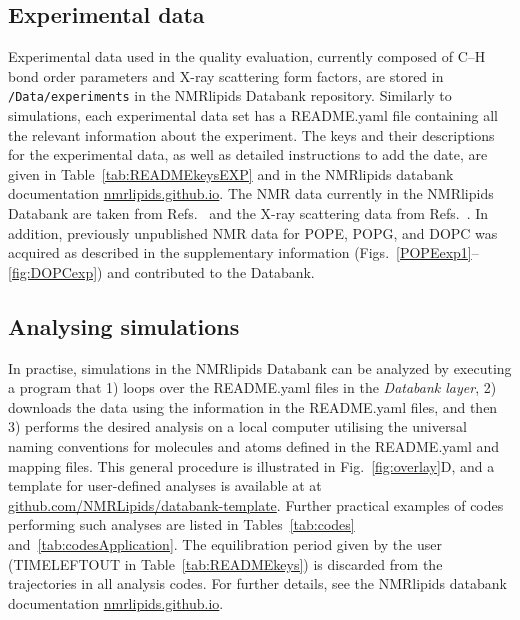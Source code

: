 \documentclass[fleqn,10pt]{wlscirep}
\begin{document}
\subsection{Experimental data}
Experimental data used in the quality evaluation, currently composed of C--H bond order parameters and X-ray scattering form factors, are stored in \texttt{/Data/experiments} in the NMRlipids Databank repository. Similarly to simulations, each experimental data set has a README.yaml file containing all the relevant information about the experiment. The keys and their descriptions for the experimental data, as well as detailed instructions to add the date, are given in Table~\ref{tab:READMEkeysEXP} and in the NMRlipids databank documentation \href{https://nmrlipids.github.io/}{nmrlipids.github.io}. The NMR data currently in the NMRlipids Databank are taken from Refs.~ and the X-ray scattering data from Refs.~. In addition, previously unpublished NMR data for POPE, POPG, and DOPC was acquired as described in the supplementary information (Figs.~\ref{POPEexp1}--\ref{fig:DOPCexp}) and contributed to the Databank. 


\subsection{Analysing simulations}
In practise, simulations in the NMRlipids Databank can be analyzed by executing a program that
1) loops over the README.yaml files in the {\it Databank layer},
2) downloads the data using the information in the README.yaml files, and then
3) performs the desired analysis on a local computer utilising the universal naming conventions for molecules and atoms defined in the README.yaml and mapping files.
This general procedure is illustrated in Fig.~\ref{fig:overlay}D, and a template for user-defined analyses is available at at \href{https://github.com/NMRLipids/databank-template}{github.com/NMRLipids/databank-template}. Further practical examples of codes  performing such analyses are listed in Tables~\ref{tab:codes} and~\ref{tab:codesApplication}.  The equilibration period given by the user (TIMELEFTOUT in Table~\ref{tab:READMEkeys}) is discarded from the trajectories in all analysis codes. For further details, see the NMRlipids databank documentation \href{https://nmrlipids.github.io/}{nmrlipids.github.io}. 
\end{document}
